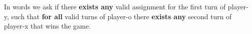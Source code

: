 \documentclass{base}
\begin{document}

In words we ask if there \textbf{exists any} valid assignment for the first turn of player-y, such that \textbf{for all} valid turns of player-o there \textbf{exists any} second turn of player-x that wins the game.
\end{document}
